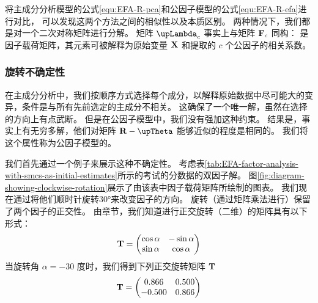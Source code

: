 将主成分分析模型的公式\eqref{equ:EFA-R-pca}和公因子模型的公式\eqref{equ:EFA-R-efa}进行对比，
可以发现这两个方法之间的相似性以及本质区别。
两种情况下，我们都是对一个二次对称矩阵进行分解。
矩阵 $ \vLambda_c $ 事实上与矩阵 $ \mathbf{F}_c $ 同构：
是因子载荷矩阵，其元素可被解释为原始变量 $ \mathbf{X} $ 和提取的 $ c $ 个公因子的相关系数。

\subsubsection{旋转不确定性}

在主成分分析中，我们按顺序方式选择每个成分，以解释原始数据中尽可能大的变异，条件是与所有先前选定的主成分不相关。
这确保了一个唯一解，虽然在选择的方向上有点武断。
但是在公因子模型中，我们没有强加这种约束。
结果是，事实上有无穷多解，他们对矩阵 $ \vR - \vTheta $ 能够近似的程度是相同的。
我们将这个属性称为公因子模型的。

我们首先通过一个例子来展示这种不确定性。
考虑表\ref{tab:EFA-factor-analysis-with-smcs-as-initial-estimates}所示的考试的分数据的双因子解。
图\ref{fig:diagram-showing-clockwise-rotation}展示了由该表中因子载荷矩阵所绘制的图表。
我们现在通过将他们顺时针旋转30°来改变因子的方向。
旋转（通过矩阵乘法进行）保留了两个因子的正交性。
由章节，我们知道进行正交旋转（二维）的矩阵具有以下形式：
\begin{equation}
    \mathbf{T} = \begin{pmatrix}
        \cos\alpha & -\sin\alpha \\ 
        \sin\alpha & \cos\alpha
    \end{pmatrix}
\end{equation}
当旋转角 $ \alpha = -30 $ 度时，我们得到下列正交旋转矩阵 $ \mathbf{T} $
\begin{equation}
    \mathbf{T} = \begin{pmatrix}
        0.866 & 0.500 \\
        -0.500 & 0.866
    \end{pmatrix}
\end{equation}


